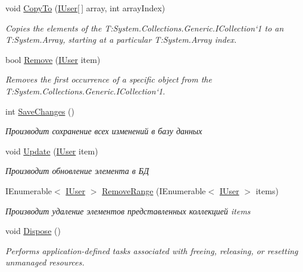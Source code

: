 \begin{DoxyCompactItemize}
void \hyperlink{class_security_1_1_entity_framework_1_1_collections_1_1_user_collection_a16a3852ec4612141cf6750418eeb21a5}{Copy\+To} (\hyperlink{interface_security_1_1_interfaces_1_1_model_1_1_i_user}{I\+User}\mbox{[}$\,$\mbox{]} array, int array\+Index)
\begin{DoxyCompactList}\small\item\em Copies the elements of the T\+:\+System.\+Collections.\+Generic.\+I\+Collection`1 to an T\+:\+System.\+Array, starting at a particular T\+:\+System.\+Array index. \end{DoxyCompactList}\item 
bool \hyperlink{class_security_1_1_entity_framework_1_1_collections_1_1_user_collection_ad61e980cac9eff5b548e412378b0ae4f}{Remove} (\hyperlink{interface_security_1_1_interfaces_1_1_model_1_1_i_user}{I\+User} item)
\begin{DoxyCompactList}\small\item\em Removes the first occurrence of a specific object from the T\+:\+System.\+Collections.\+Generic.\+I\+Collection`1. \end{DoxyCompactList}\item 
int \hyperlink{class_security_1_1_entity_framework_1_1_collections_1_1_user_collection_af8f55c52a436c007a9665b4b2fd974b5}{Save\+Changes} ()
\begin{DoxyCompactList}\small\item\em Производит сохранение всех изменений в базу данных \end{DoxyCompactList}\item 
void \hyperlink{class_security_1_1_entity_framework_1_1_collections_1_1_user_collection_ae5cdf6eacee61676c777293bb5f54cfa}{Update} (\hyperlink{interface_security_1_1_interfaces_1_1_model_1_1_i_user}{I\+User} item)
\begin{DoxyCompactList}\small\item\em Производит обновление элемента в БД \end{DoxyCompactList}\item 
I\+Enumerable$<$ \hyperlink{interface_security_1_1_interfaces_1_1_model_1_1_i_user}{I\+User} $>$ \hyperlink{class_security_1_1_entity_framework_1_1_collections_1_1_user_collection_a0c6936660dfede0da76da7147467775c}{Remove\+Range} (I\+Enumerable$<$ \hyperlink{interface_security_1_1_interfaces_1_1_model_1_1_i_user}{I\+User} $>$ items)
\begin{DoxyCompactList}\small\item\em Производит удаление элементов представленных коллекцией items \end{DoxyCompactList}\item 
void \hyperlink{class_security_1_1_entity_framework_1_1_collections_1_1_user_collection_a5eef1e189b4f4de73b3850cad7eb708b}{Dispose} ()
\begin{DoxyCompactList}\small\item\em Performs application-\/defined tasks associated with freeing, releasing, or resetting unmanaged resources. \end{DoxyCompactList}\end{DoxyCompactItemize}
